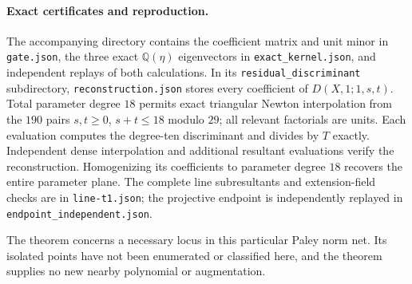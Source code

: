 \paragraph{Exact certificates and reproduction.}
The accompanying directory
contains the coefficient matrix and unit minor in \texttt{gate.json},
the three exact $\mathbb Q(\eta)$ eigenvectors in
\texttt{exact\_kernel.json}, and independent replays of both calculations.
In its \texttt{residual\_discriminant} subdirectory,
\texttt{reconstruction.json} stores every coefficient of
$D(X,1;1,s,t)$.  Total parameter degree $18$ permits exact triangular
Newton interpolation from the $190$ pairs
$s,t\ge0$, $s+t\le18$ modulo $29$; all relevant factorials are units.
Each evaluation computes the degree-ten discriminant and divides by
$T$ exactly.  Independent dense interpolation and additional resultant
evaluations verify the reconstruction.  Homogenizing its coefficients
to parameter degree $18$ recovers the entire parameter plane.
The complete line subresultants and extension-field checks are in
\texttt{line-t1.json}; the projective endpoint is independently replayed
in \texttt{endpoint\_independent.json}.

The theorem concerns a necessary locus in this particular Paley norm net.
Its isolated points have not been enumerated or classified here, and
the theorem supplies no new nearby polynomial or augmentation.
